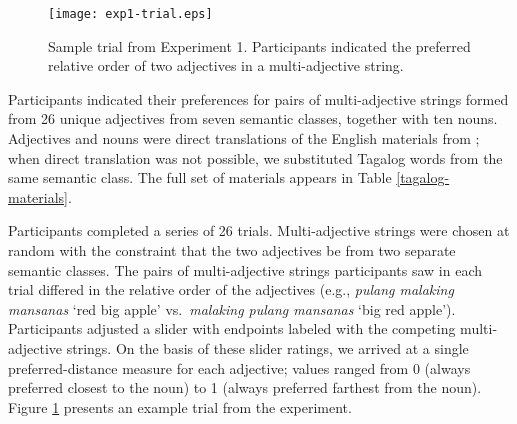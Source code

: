 \documentclass[12pt,letterpaper]{article}
\begin{document}
\begin{figure}
	\centering
	\texttt{[image: exp1-trial.eps]}
	\caption{Sample trial from Experiment 1. Participants indicated the preferred relative order of two adjectives in a multi-adjective string.
	}
	\label{exp1-trial}
\end{figure}

Participants indicated their preferences for pairs of multi-adjective strings formed from 26 unique adjectives from seven semantic classes, together with ten nouns. Adjectives and nouns were direct translations of the English materials from \cite{scontrasetal2017adjectives}; when direct translation was not possible, we substituted Tagalog words from the same semantic class. The full set of materials appears in Table \ref{tagalog-materials}.

Participants completed a series of 26 trials. Multi-adjective strings were chosen at random with the constraint that the two adjectives be from two separate semantic classes. The pairs of multi-adjective strings participants saw in each trial differed in the relative order of the adjectives (e.g., \emph{pulang malaking mansanas} `red big apple' vs.~\emph{malaking pulang mansanas} `big red apple'). Participants adjusted a slider with endpoints labeled with the competing multi-adjective strings. On the basis of these slider ratings, we arrived at a single preferred-distance measure for each adjective; values ranged from 0 (always preferred closest to the noun) to 1 (always preferred farthest from the noun). Figure \ref{exp1-trial} presents an example trial from the experiment.

\end{document}
